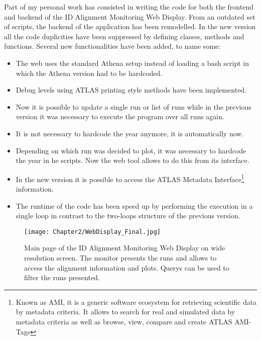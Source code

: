 Part of my personal work has consisted in writing the code for both
the frontend and backend of the ID Alignment Monitoring Web Display. 
From an outdated set of scripts, the backend of the application has been remodelled. In the new version
all the code duplicities have been suppressed by defining classes, methods and functions. 
Several new functionalities have been added, to name some:
\begin{itemize}
	\item The web uses the standard Athena setup instead of loading a 
	bash script in which the Athena version had to be hardcoded.
	\item Debug levels using ATLAS printing style methods have been implemented.
	\item Now it is possible to update a single run or list of runs while in the 
	previous version it was necessary to execute the program over all runs again.
	\item It is not necessary to hardcode the year anymore, it is automatically now.
	\item Depending on which run was decided to plot, it was necessary to hardcode
	the year in he scripts. Now the web tool allows to do this from its interface.
	\item In the new version it is possible to access the ATLAS Metadata Interface\footnote{
	Known as AMI, it is a generic software ecosystem for retrieving scientific data by metadata 
	criteria. It allows to search for real and simulated data by metadata criteria as well as browse, view, 
	compare and create ATLAS AMI-Tags} information.
	\item The runtime of the code has been speed up by performing the execution in a single loop in contrast
	to the two-loops structure of the previous version. 

\end{itemize}

\begin{figure}[htp]
\centering
  \texttt{[image: Chapter2/WebDisplay\_Final.jpg]}
\caption{Main page of the ID Alignment Monitoring Web Display on wide resolution screen. The
monitor presents the runs and allows to access the alignment information and plots. Querys can be used
to filter the runs presented.}
\label{fig:Chap2:Alignment:WebDisplay}
\end{figure}

